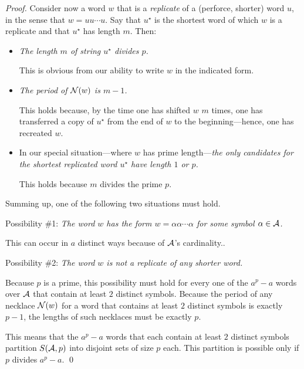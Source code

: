 \begin{proof}
Consider now a word $w$ that is a {\it replicate} of a (perforce, shorter) word $u$, in the sense that $w = uu \cdots u$.  Say that $u^\star$ is the shortest word of which $w$ is a replicate and that $u^\star$ has length $m$.  Then:
\begin{itemize}
\item
{\em The length $m$ of string $u^\star$ divides $p$.}

\smallskip

This is obvious from our ability to write $w$ in the indicated form.

\item
{\em The period of $\mbox{$\cal N$}(w)$ is $m-1$.}

\smallskip

This holds because, by the time one has shifted $w$ $m$ times, one has transferred a copy of $u^\star$ from the end of $w$ to the beginning---hence, one has recreated $w$.

\item
In our special situation---where $w$ has prime length---{\em the only candidates for the shortest replicated word $u^\star$ have length $1$ or $p$.}

\smallskip

This holds because $m$ divides the prime $p$.
\end{itemize}
Summing up, one of the following two situations must hold.

\medskip

\noindent
Possibility \#1:
{\em The word $w$ has the form $w = \alpha \alpha \cdots \alpha$ for some symbol $\alpha \in \mbox{$\cal A$}$.}

This can occur in $a$ distinct ways because of $\mbox{$\cal A$}$'s cardinality..

\medskip

\noindent
Possibility \#2:
{\em The word $w$ is not a replicate of any shorter word.}

\smallskip

Because $p$ is a prime, this possibility must hold for every one of the $a^p - a$ words over $\mbox{$\cal A$}$ that contain at least $2$ distinct symbols.  Because the period of any necklace $\mbox{$\cal N$}(w)$ for a word that contains at least $2$ distinct symbols is exactly $p-1$, the lengths of such necklaces must be exactly $p$.

This means that the $a^p - a$ words that each contain at least $2$ distinct symbols partition $S(\mbox{$\cal A$}, p)$ into disjoint sets of size $p$ each.  This partition is possible only if $p$ divides $a^p - a$.  \qed
\end{proof}


